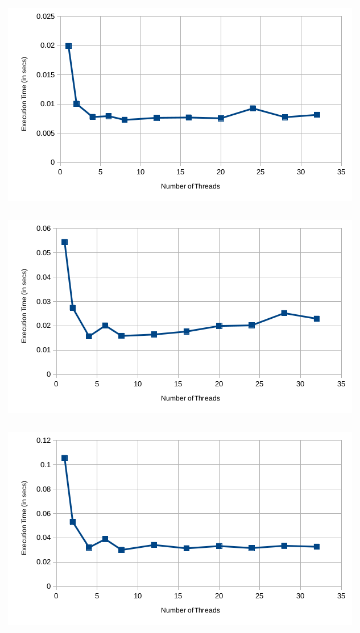 \documentclass{article}
\begin{document}
\begin{figure}[!htbp]

	\centering
	\begin{subfigure}[!htbp]{\textwidth}
		\centering
		\includegraphics[scale=0.8]{without-sections-3x3-performance}
	\end{subfigure}
	
	\begin{subfigure}[!htbp]{\textwidth}
		\centering
		\includegraphics[scale=0.8]{without-sections-5x5-performance}
	\end{subfigure}
	
	\begin{subfigure}[!htbp]{\textwidth}
		\centering
		\includegraphics[scale=0.8]{without-sections-7x7-performance}
	\end{subfigure}
	

\end{figure}
\end{document}

